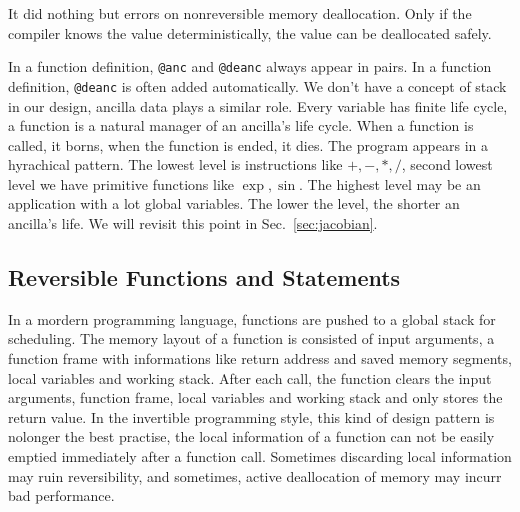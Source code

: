 \documentclass{article}
\newcommand{\<}{\langle}
\renewcommand{\>}{\rangle}
\newcommand{\Sec}[1]{Sec.~\ref{#1}}
\begin{document}
It did nothing but errors on nonreversible memory deallocation. Only if the compiler knows the value deterministically, the value can be deallocated safely.

In a function definition, \texttt{@anc} and \texttt{@deanc} always appear in pairs. In a function definition, \texttt{@deanc} is often added automatically.
We don't have a concept of stack in our design, ancilla data plays a similar role. Every variable has finite life cycle, a function is a natural manager of an ancilla's life cycle. When a function is called, it borns, when the function is ended, it dies.
The program appears in a hyrachical pattern. The lowest level is instructions like $+, -, *, /$, second lowest level we have primitive functions like $\exp, \sin$. The highest level may be an application with a lot global variables.
The lower the level, the shorter an ancilla's life. We will revisit this point in \Sec{sec:jacobian}.

\subsection{Reversible Functions and Statements}
In a mordern programming language, functions are pushed to a global stack for scheduling. The memory layout of a function is consisted of input arguments, a function frame with informations like return address and saved memory segments, local variables and working stack. After each call, the function clears the input arguments, function frame, local variables and working stack and only stores the return value.
In the invertible programming style, this kind of design pattern is nolonger the best practise, the local information of a function can not be easily emptied immediately after a function call. Sometimes discarding local information may ruin reversibility, and sometimes, active deallocation of memory may incurr bad performance.
\end{document}
